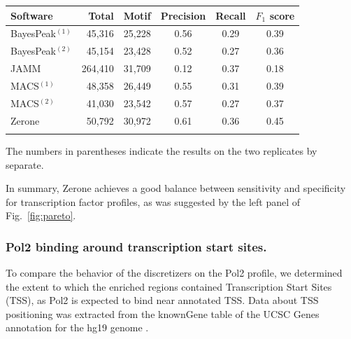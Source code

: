 \documentclass{bioinfo}
\begin{document}
\begin{table}[!t]
{\begin{tabular}{lrrccc}
        \toprule
        \textbf{Software}  & \textbf{Total}  & \textbf{Motif} &
        \textbf{Precision} & \textbf{Recall} & \textbf{$F_{1}$ score} \\
        \midrule
        BayesPeak$^{(1)}$ &  45,316 & 25,228 & 0.56 & 0.29 & 0.39 \\
        BayesPeak$^{(2)}$ &  45,154 & 23,428 & 0.52 & 0.27 & 0.36 \\
        JAMM              & 264,410 & 31,709 & 0.12 & 0.37 & 0.18 \\
        MACS$^{(1)}$      &  48,358 & 26,449 & 0.55 & 0.31 & 0.39 \\
        MACS$^{(2)}$      &  41,030 & 23,542 & 0.57 & 0.27 & 0.37 \\
        Zerone            &  50,792 & 30,972 & 0.61 & 0.36 & 0.45 \\
        \botrule
\end{tabular}}{The numbers in parentheses indicate the results on the two
replicates by separate.}
\end{table}

In summary, Zerone achieves a good balance between sensitivity and
specificity for transcription factor profiles, as was suggested by
the left panel of Fig.~\ref{fig:pareto}.

\subsubsection{Pol2 binding around transcription start sites.}
To compare the behavior of the discretizers on the Pol2 profile,
we determined the extent to which the enriched regions contained
Transcription Start Sites (TSS), as Pol2 is expected to bind near
annotated TSS. Data about TSS positioning was extracted from the
knownGene table of the UCSC Genes annotation for the hg19 genome
\citep{Karolchik2004}.
\end{document}
